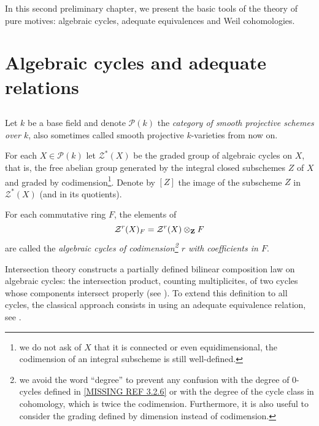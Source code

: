\documentclass[../main.tex]{subfiles}
\begin{document}
In this second preliminary chapter, we present the basic tools of the theory of pure motives: algebraic cycles, adequate equivalences and Weil cohomologies.

\section{Algebraic cycles and adequate relations}

\subsection{} Let $k$ be a base field and denote $\mathcal{P}(k)$ the \emph{category of smooth projective schemes over $k$}, also sometimes called smooth projective $k$-varieties from now on.

For each $X \in \mathcal{P}(k)$ let $\mathcal{Z}^*(X)$ be the graded group of algebraic cycles on $X$, that is, the free abelian group generated by the integral closed subschemes $Z$ of $X$ and graded by codimension\footnote{we do not ask of $X$ that it is connected or even equidimensional, the codimension of an integral subscheme is still well-defined.}.
Denote by $[Z]$ the image of the subscheme $Z$ in $\mathcal{Z}^*(X)$ (and in its quotients).

For each commutative ring $F$, the elements of
$$\mathcal{Z}^r(X)_F = \mathcal{Z}^r(X) \otimes_{\mathbf{Z}} F$$
are called the \emph{algebraic cycles of codimension\footnote{we avoid the word \enquote{degree} to prevent any confusion with the degree of $0$-cycles defined in \ref{MISSING REF 3.2.6} or with the degree of the cycle class in cohomology, which is twice the codimension. Furthermore, it is also useful to consider the grading defined by dimension instead of codimension.} $r$ with coefficients in $F$}.

Intersection theory constructs a partially defined bilinear composition law on algebraic cycles: the intersection product, counting multiplicites, of two cycles whose components intersect properly (see \cite{se57}).
To extend this definition to all cycles, the classical approach consists in using an adequate equivalence relation, see \cite{sa58}.
\end{document}
